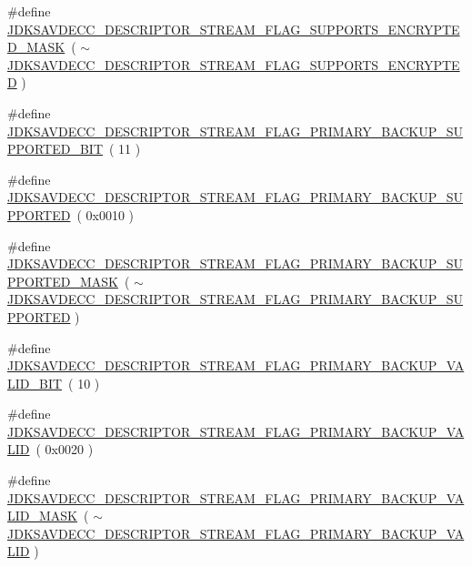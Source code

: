 \begin{DoxyCompactItemize}
\item 
\#define \hyperlink{group__descriptor__stream_ga34e600e2b5cedff64cae27277ccc3d50}{J\+D\+K\+S\+A\+V\+D\+E\+C\+C\+\_\+\+D\+E\+S\+C\+R\+I\+P\+T\+O\+R\+\_\+\+S\+T\+R\+E\+A\+M\+\_\+\+F\+L\+A\+G\+\_\+\+S\+U\+P\+P\+O\+R\+T\+S\+\_\+\+E\+N\+C\+R\+Y\+P\+T\+E\+D\+\_\+\+M\+A\+SK}~( $\sim$\hyperlink{group__descriptor__stream_ga05c1eb950269a1a251f716c75bd3ffc5}{J\+D\+K\+S\+A\+V\+D\+E\+C\+C\+\_\+\+D\+E\+S\+C\+R\+I\+P\+T\+O\+R\+\_\+\+S\+T\+R\+E\+A\+M\+\_\+\+F\+L\+A\+G\+\_\+\+S\+U\+P\+P\+O\+R\+T\+S\+\_\+\+E\+N\+C\+R\+Y\+P\+T\+ED} )
\item 
\#define \hyperlink{group__descriptor__stream_gabae7584907de6d242fa923554103ffd2}{J\+D\+K\+S\+A\+V\+D\+E\+C\+C\+\_\+\+D\+E\+S\+C\+R\+I\+P\+T\+O\+R\+\_\+\+S\+T\+R\+E\+A\+M\+\_\+\+F\+L\+A\+G\+\_\+\+P\+R\+I\+M\+A\+R\+Y\+\_\+\+B\+A\+C\+K\+U\+P\+\_\+\+S\+U\+P\+P\+O\+R\+T\+E\+D\+\_\+\+B\+IT}~( 11 )
\item 
\#define \hyperlink{group__descriptor__stream_ga3b35f9101b27fe514d7770c4c566f8d3}{J\+D\+K\+S\+A\+V\+D\+E\+C\+C\+\_\+\+D\+E\+S\+C\+R\+I\+P\+T\+O\+R\+\_\+\+S\+T\+R\+E\+A\+M\+\_\+\+F\+L\+A\+G\+\_\+\+P\+R\+I\+M\+A\+R\+Y\+\_\+\+B\+A\+C\+K\+U\+P\+\_\+\+S\+U\+P\+P\+O\+R\+T\+ED}~( 0x0010 )
\item 
\#define \hyperlink{group__descriptor__stream_ga18e309fcef458ffa29bb1f1aea42a8e1}{J\+D\+K\+S\+A\+V\+D\+E\+C\+C\+\_\+\+D\+E\+S\+C\+R\+I\+P\+T\+O\+R\+\_\+\+S\+T\+R\+E\+A\+M\+\_\+\+F\+L\+A\+G\+\_\+\+P\+R\+I\+M\+A\+R\+Y\+\_\+\+B\+A\+C\+K\+U\+P\+\_\+\+S\+U\+P\+P\+O\+R\+T\+E\+D\+\_\+\+M\+A\+SK}~( $\sim$\hyperlink{group__descriptor__stream_ga3b35f9101b27fe514d7770c4c566f8d3}{J\+D\+K\+S\+A\+V\+D\+E\+C\+C\+\_\+\+D\+E\+S\+C\+R\+I\+P\+T\+O\+R\+\_\+\+S\+T\+R\+E\+A\+M\+\_\+\+F\+L\+A\+G\+\_\+\+P\+R\+I\+M\+A\+R\+Y\+\_\+\+B\+A\+C\+K\+U\+P\+\_\+\+S\+U\+P\+P\+O\+R\+T\+ED} )
\item 
\#define \hyperlink{group__descriptor__stream_ga887297aafc2484858194be9efa7fa726}{J\+D\+K\+S\+A\+V\+D\+E\+C\+C\+\_\+\+D\+E\+S\+C\+R\+I\+P\+T\+O\+R\+\_\+\+S\+T\+R\+E\+A\+M\+\_\+\+F\+L\+A\+G\+\_\+\+P\+R\+I\+M\+A\+R\+Y\+\_\+\+B\+A\+C\+K\+U\+P\+\_\+\+V\+A\+L\+I\+D\+\_\+\+B\+IT}~( 10 )
\item 
\#define \hyperlink{group__descriptor__stream_gaa04c1a7dabfeb5223d89bf81c581fdde}{J\+D\+K\+S\+A\+V\+D\+E\+C\+C\+\_\+\+D\+E\+S\+C\+R\+I\+P\+T\+O\+R\+\_\+\+S\+T\+R\+E\+A\+M\+\_\+\+F\+L\+A\+G\+\_\+\+P\+R\+I\+M\+A\+R\+Y\+\_\+\+B\+A\+C\+K\+U\+P\+\_\+\+V\+A\+L\+ID}~( 0x0020 )
\item 
\#define \hyperlink{group__descriptor__stream_gaa43f7b2251789802a157bb4a0639566c}{J\+D\+K\+S\+A\+V\+D\+E\+C\+C\+\_\+\+D\+E\+S\+C\+R\+I\+P\+T\+O\+R\+\_\+\+S\+T\+R\+E\+A\+M\+\_\+\+F\+L\+A\+G\+\_\+\+P\+R\+I\+M\+A\+R\+Y\+\_\+\+B\+A\+C\+K\+U\+P\+\_\+\+V\+A\+L\+I\+D\+\_\+\+M\+A\+SK}~( $\sim$\hyperlink{group__descriptor__stream_gaa04c1a7dabfeb5223d89bf81c581fdde}{J\+D\+K\+S\+A\+V\+D\+E\+C\+C\+\_\+\+D\+E\+S\+C\+R\+I\+P\+T\+O\+R\+\_\+\+S\+T\+R\+E\+A\+M\+\_\+\+F\+L\+A\+G\+\_\+\+P\+R\+I\+M\+A\+R\+Y\+\_\+\+B\+A\+C\+K\+U\+P\+\_\+\+V\+A\+L\+ID} )

\end{DoxyCompactItemize}

